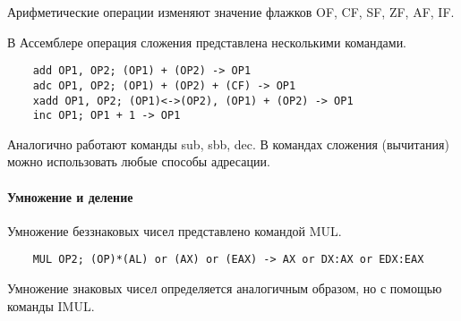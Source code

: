 Арифметические операции изменяют значение флажков OF, CF, SF, ZF, AF, IF.

В Ассемблере операция сложения представлена несколькими командами.

\begin{verbatim}
    add OP1, OP2; (OP1) + (OP2) -> OP1
    adc OP1, OP2; (OP1) + (OP2) + (CF) -> OP1
    xadd OP1, OP2; (OP1)<->(OP2), (OP1) + (OP2) -> OP1
    inc OP1; OP1 + 1 -> OP1
\end{verbatim}

Аналогично работают команды sub, sbb, dec. В командах сложения (вычитания) можно использовать любые способы адресации.

\paragraph{Умножение и деление}

Умножение беззнаковых чисел представлено командой MUL.
\begin{verbatim}
    MUL OP2; (OP)*(AL) or (AX) or (EAX) -> AX or DX:AX or EDX:EAX
\end{verbatim}

Умножение знаковых чисел определяется аналогичным образом, но с помощью команды IMUL.



